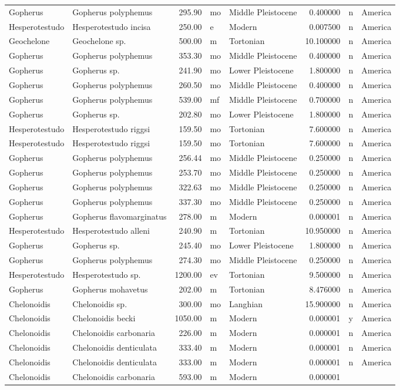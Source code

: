 \documentclass[]{article}
\begin{document}
\begin{longtable}[]{@{}llrllrll@{}}
Gopherus & Gopherus polyphemus & 295.90 & mo & Middle Pleistocene &
0.400000 & n & America\tabularnewline
Hesperotestudo & Hesperotestudo incisa & 250.00 & e & Modern & 0.007500
& n & America\tabularnewline
Geochelone & Geochelone sp. & 500.00 & m & Tortonian & 10.100000 & n &
America\tabularnewline
Gopherus & Gopherus polyphemus & 353.30 & mo & Middle Pleistocene &
0.400000 & n & America\tabularnewline
Gopherus & Gopherus sp. & 241.90 & mo & Lower Pleistocene & 1.800000 & n
& America\tabularnewline
Gopherus & Gopherus polyphemus & 260.50 & mo & Middle Pleistocene &
0.400000 & n & America\tabularnewline
Gopherus & Gopherus polyphemus & 539.00 & mf & Middle Pleistocene &
0.700000 & n & America\tabularnewline
Gopherus & Gopherus sp. & 202.80 & mo & Lower Pleistocene & 1.800000 & n
& America\tabularnewline
Hesperotestudo & Hesperotestudo riggsi & 159.50 & mo & Tortonian &
7.600000 & n & America\tabularnewline
Hesperotestudo & Hesperotestudo riggsi & 159.50 & mo & Tortonian &
7.600000 & n & America\tabularnewline
Gopherus & Gopherus polyphemus & 256.44 & mo & Middle Pleistocene &
0.250000 & n & America\tabularnewline
Gopherus & Gopherus polyphemus & 253.70 & mo & Middle Pleistocene &
0.250000 & n & America\tabularnewline
Gopherus & Gopherus polyphemus & 322.63 & mo & Middle Pleistocene &
0.250000 & n & America\tabularnewline
Gopherus & Gopherus polyphemus & 337.30 & mo & Middle Pleistocene &
0.250000 & n & America\tabularnewline
Gopherus & Gopherus flavomarginatus & 278.00 & m & Modern & 0.000001 & n
& America\tabularnewline
Hesperotestudo & Hesperotestudo alleni & 240.90 & m & Tortonian &
10.950000 & n & America\tabularnewline
Gopherus & Gopherus sp. & 245.40 & mo & Lower Pleistocene & 1.800000 & n
& America\tabularnewline
Gopherus & Gopherus polyphemus & 274.30 & mo & Middle Pleistocene &
0.250000 & n & America\tabularnewline
Hesperotestudo & Hesperotestudo sp. & 1200.00 & ev & Tortonian &
9.500000 & n & America\tabularnewline
Gopherus & Gopherus mohavetus & 202.00 & m & Tortonian & 8.476000 & n &
America\tabularnewline
Chelonoidis & Chelonoidis sp. & 300.00 & mo & Langhian & 15.900000 & n &
America\tabularnewline
Chelonoidis & Chelonoidis becki & 1050.00 & m & Modern & 0.000001 & y &
America\tabularnewline
Chelonoidis & Chelonoidis carbonaria & 226.00 & m & Modern & 0.000001 &
n & America\tabularnewline
Chelonoidis & Chelonoidis denticulata & 333.40 & m & Modern & 0.000001 &
n & America\tabularnewline
Chelonoidis & Chelonoidis denticulata & 333.00 & m & Modern & 0.000001 &
n & America\tabularnewline
Chelonoidis & Chelonoidis carbonaria & 593.00 & m & Modern & 0.000001 &

\end{longtable}
\end{document}
